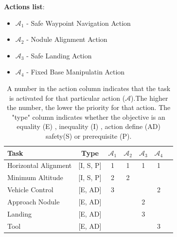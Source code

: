 \documentclass{article}
\begin{document}
\noindent
\textbf{Actions list}:
\begin{itemize}
	\item $\mathcal{A}_{1}$ - Safe Waypoint Navigation Action 
	\item $\mathcal{A}_{2}$ - Nodule Alignment Action 
	\item $\mathcal{A}_{3}$ - Safe Landing Action 
	\item $\mathcal{A}_{4}$ - Fixed Base Manipulatin Action
\end{itemize}

\begin{table}[htb]
	\label{tbl:actions_tables}
	\begin{center}
		\footnotesize
		\begin{tabular}{lcccccc}
			\toprule		
			Task & Type & $\mathcal{A}_{1}$ & $\mathcal{A}_{2}$  & $\mathcal{A}_{3}$  & $\mathcal{A}_{4}$ \\
			\midrule
			
			Horizontal Alignment                & [I, S, P] & 1 & 1 & 1 & 1 \\
			\hdashline
			Minimum Altitude                    & [I, S, P] & 2 & 2 & &   \\
			\hdashline 
			Vehicle Control 						& [E, AD] &3 & & & 2\\ 
			\hdashline 
			Approach Nodule  						& [E, AD] & & & 2&  \\ 
			\hdashline
			Landing 						& [E, AD] & &  & 3& \\
			
			\hdashline 
			Tool 					& [E, AD] &  & & &3 \\
			
			\bottomrule
		\end{tabular}
	\end{center}
\caption{A number in the action column indicates that the task is activated for that particular action ($\mathcal{A}$).The higher the number, the lower the priority for that action. The "type" column indicates whether the objective is an equality (E) , inequality (I) , action define (AD) safety(S) or prerequisite (P).}
\end{table}
\end{document}
